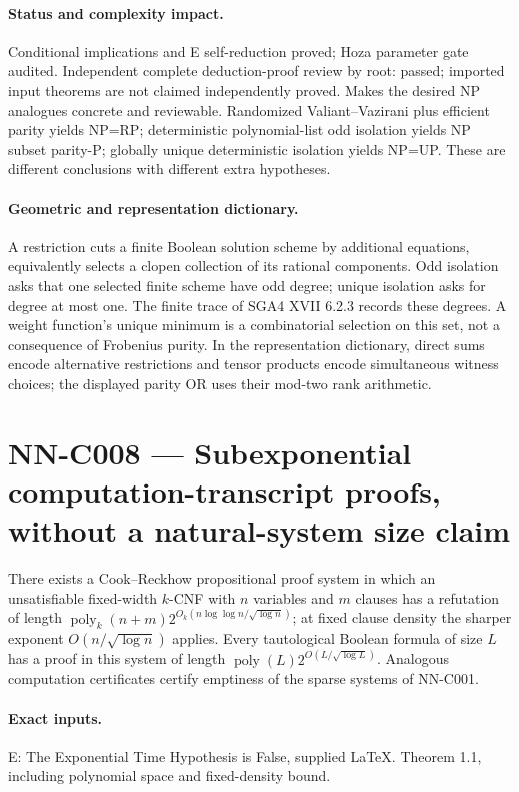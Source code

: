 \paragraph{Status and complexity impact.}
Conditional implications and E self-reduction proved; Hoza parameter gate audited. Independent complete deduction-proof review by root: passed; imported input theorems are not claimed independently proved. Makes the desired NP analogues concrete and reviewable. Randomized Valiant--Vazirani plus efficient parity yields NP=RP; deterministic polynomial-list odd isolation yields NP subset parity-P; globally unique deterministic isolation yields NP=UP. These are different conclusions with different extra hypotheses.

\paragraph{Geometric and representation dictionary.}
A restriction cuts a finite Boolean solution scheme by additional equations, equivalently selects a clopen collection of its rational components. Odd isolation asks that one selected finite scheme have odd degree; unique isolation asks for degree at most one. The finite trace of SGA4 XVII 6.2.3 records these degrees. A weight function's unique minimum is a combinatorial selection on this set, not a consequence of Frobenius purity. In the representation dictionary, direct sums encode alternative restrictions and tensor products encode simultaneous witness choices; the displayed parity OR uses their mod-two rank arithmetic.



\section{NN-C008 --- Subexponential computation-transcript proofs, without a natural-system size claim}
\begin{proposition}[NN-C008]
There exists a Cook--Reckhow propositional proof system in which an unsatisfiable fixed-width $k$-CNF with $n$ variables and $m$ clauses has a refutation of length $\operatorname{poly}_k(n+m)2^{O_k(n\log\log n/\sqrt{\log n})}$; at fixed clause density the sharper exponent $O(n/\sqrt{\log n})$ applies. Every tautological Boolean formula of size $L$ has a proof in this system of length $\operatorname{poly}(L)2^{O(L/\sqrt{\log L})}$. Analogous computation certificates certify emptiness of the sparse systems of NN-C001.
\end{proposition}
\paragraph{Exact inputs.}
E: The Exponential Time Hypothesis is False, supplied LaTeX. Theorem 1.1, including polynomial space and fixed-density bound.

